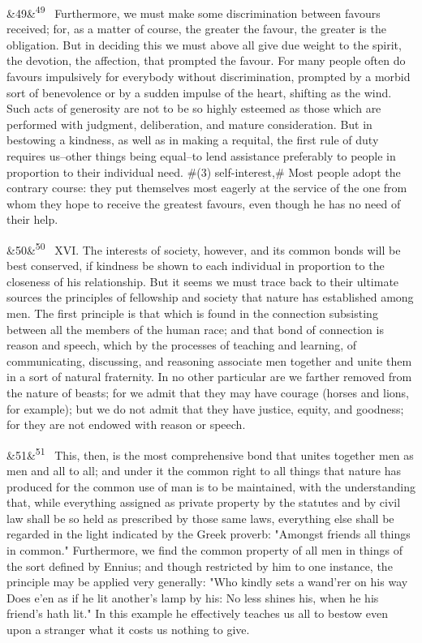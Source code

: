 \documentclass[12pt]{article}
\newcommand{\para}[1][]{\par\noindent\ifx&#1&\else\textsuperscript{\footnotesize #1}~\fi}
\begin{document}
\para[49] Furthermore, we must make some discrimination between favours received; for, as a matter of course, the greater the favour, the greater is the obligation. But in deciding this we must above all give due weight to the spirit, the devotion, the affection, that prompted the favour. For many people often do favours impulsively for everybody without discrimination, prompted by a morbid sort of benevolence or by a sudden impulse of the heart, shifting as the wind. Such acts of generosity are not to be so highly esteemed as those which are performed with judgment, deliberation, and mature consideration. But in bestowing a kindness, as well as in making a requital, the first rule of duty requires us--other things being equal--to lend assistance preferably to people in proportion to their individual need. \#(3) self-interest,\# Most people adopt the contrary course: they put themselves most eagerly at the service of the one from whom they hope to receive the greatest favours, even though he has no need of their help.

\para[50] XVI. The interests of society, however, and its common bonds will be best conserved, if kindness be shown to each individual in proportion to the closeness of his relationship. But it seems we must trace back to their ultimate sources the principles of fellowship and society that nature has established among men. The first principle is that which is found in the connection subsisting between all the members of the human race; and that bond of connection is reason and speech, which by the processes of teaching and learning, of communicating, discussing, and reasoning associate men together and unite them in a sort of natural fraternity. In no other particular are we farther removed from the nature of beasts; for we admit that they may have courage (horses and lions, for example); but we do not admit that they have justice, equity, and goodness; for they are not endowed with reason or speech.

\para[51] This, then, is the most comprehensive bond that unites together men as men and all to all; and under it the common right to all things that nature has produced for the common use of man is to be maintained, with the understanding that, while everything assigned as private property by the statutes and by civil law shall be so held as prescribed by those same laws, everything else shall be regarded in the light indicated by the Greek proverb: "Amongst friends all things in common." Furthermore, we find the common property of all men in things of the sort defined by Ennius; and though restricted by him to one instance, the principle may be applied very generally: "Who kindly sets a wand'rer on his way Does e'en as if he lit another's lamp by his: No less shines his, when he his friend's hath lit." In this example he effectively teaches us all to bestow even upon a stranger what it costs us nothing to give.
\end{document}
